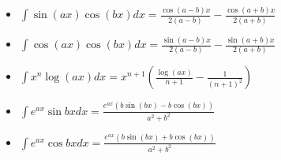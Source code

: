 \documentclass[12pt]{article}
\begin{document}
\begin{multicols}{3}
\begin{itemize}
    \item $\int \sin(ax)\cos(bx)dx = \frac{\cos(a-b)x}{2(a-b)} - \frac{\cos(a+b)x}{2(a+b)}$
    \item $\int \cos(ax)\cos(bx)dx = \frac{\sin(a-b)x}{2(a-b)} - \frac{\sin(a+b)x}{2(a+b)}$
    \item $\int x^n\log(ax)dx = x^{n+1} \left(\frac{\log(ax)}{n+1}- \frac{1}{(n+1)^2}\right)$
    \item $\int e^{ax}\sin{bx}dx = \frac{e^{ax}(b\sin(bx)-b\cos(bx))}{a^2+b^2}$
    \item $\int e^{ax}\cos{bx}dx = \frac{e^{ax}(b\sin(bx)+b\cos(bx))}{a^2+b^2}$
\end{itemize} 
\end{multicols}
\end{document}
